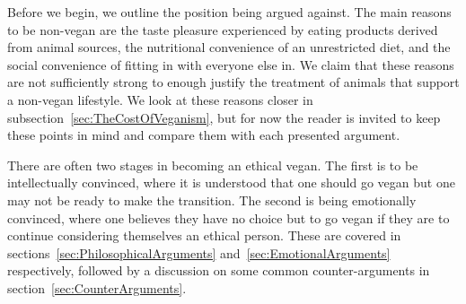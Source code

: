 Before we begin, we outline the position being argued against. The main reasons to be non-vegan are the taste pleasure experienced by eating products derived from animal sources, the nutritional convenience of an unrestricted diet, and the social convenience of fitting in with everyone else in. We claim that these reasons are not sufficiently strong to enough justify the treatment of animals that support a non-vegan lifestyle. We look at these reasons closer in subsection~\ref{sec:TheCostOfVeganism}, but for now the reader is invited to keep these points in mind and compare them with each presented argument.

There are often two stages in becoming an ethical vegan. The first is to be intellectually convinced, where it is understood that one should go vegan but one may not be ready to make the transition. The second is being emotionally convinced, where one believes they have no choice but to go vegan if they are to continue considering themselves an ethical person. These are covered in sections~\ref{sec:PhilosophicalArguments} and~\ref{sec:EmotionalArguments} respectively, followed by a discussion on some common counter-arguments in section~\ref{sec:CounterArguments}.

